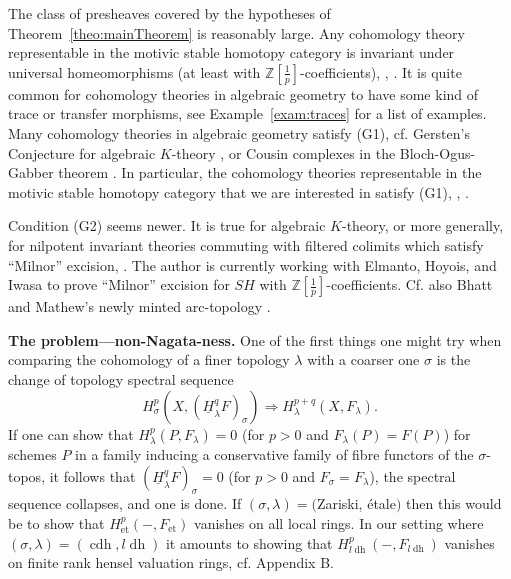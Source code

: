 \documentclass[10pt]{amsart}
\renewcommand{\implies}{\Rightarrow}
\theoremstyle{definition}
\newcommand{\ZZ}{\mathbb{Z}}
\newcommand{\et}{\operatorname{et}}
\newcommand{\ulh}{\underline{H}}
\newcommand{\cdh}{{{\operatorname{cdh}}}}
\newcommand{\ldh}{{l{\operatorname{dh}}}}
\begin{document}
The class of presheaves covered by the hypotheses of Theorem~\ref{theo:mainTheorem} is reasonably large. Any cohomology theory representable in the motivic stable homotopy category is invariant under universal homeomorphisms (at least with $\ZZ[\tfrac{1}{p}]$-coefficients), \cite{EK18}, \cite[Lem.3.15]{CD15}. It is quite common for cohomology theories in algebraic geometry to have some kind of trace or transfer morphisms, see Example~\ref{exam:traces} for a list of examples. Many cohomology theories in algebraic geometry satisfy (G1), cf. Gersten's Conjecture for algebraic $K$-theory \cite[Thm. 7.5.11]{Qui73}, or Cousin complexes in the Bloch-Ogus-Gabber theorem \cite{CTHK}. In particular, the cohomology theories representable in the motivic stable homotopy category that we are interested in satisfy (G1), \cite[Rmk.3.2]{KM18}, \cite[Thm.3.3.1]{Kel17}.

Condition (G2) seems newer. It is true for algebraic $K$-theory, or more generally, for nilpotent invariant theories commuting with filtered colimits which satisfy ``Milnor'' excision, \cite[Lem.3.5]{KM18}. The author is currently working with Elmanto, Hoyois, and Iwasa to prove ``Milnor'' excision for $SH$ with $\ZZ[\tfrac{1}{p}]$-coefficients. Cf. also Bhatt and Mathew's newly minted arc-topology \cite[Thm.1.6]{BM18}.


\textbf{The problem---non-Nagata-ness.} One of the first things one might try when comparing the cohomology of a finer topology $\lambda$ with a coarser one $\sigma$ is the change of topology spectral sequence
\[ H^p_\sigma(X, (\ulh_\lambda^q F)_\sigma) \implies H^{p+q}_\lambda(X, F_\lambda). \]
If one can show that $H^p_\lambda(P, F_\lambda) = 0$ (for $p > 0$ and $F_\lambda(P) = F(P)$) for schemes $P$ in a family inducing a conservative family of fibre functors of the $\sigma$-topos, it follows that $(\ulh_\lambda^qF)_\sigma = 0$ (for $p > 0$ and $F_\sigma = F_\lambda$), the spectral sequence collapses, and one is done. If $(\sigma, \lambda) = ($Zariski, étale$)$ then this would be to show that $H^p_{\et}(-, F_{\et})$ vanishes on all local rings. In our setting where $(\sigma, \lambda) = (\cdh, \ldh)$ it amounts to showing that $H_\ldh^p(-, F_\ldh)$ vanishes on finite rank hensel valuation rings, cf. Appendix B.%
\end{document}

